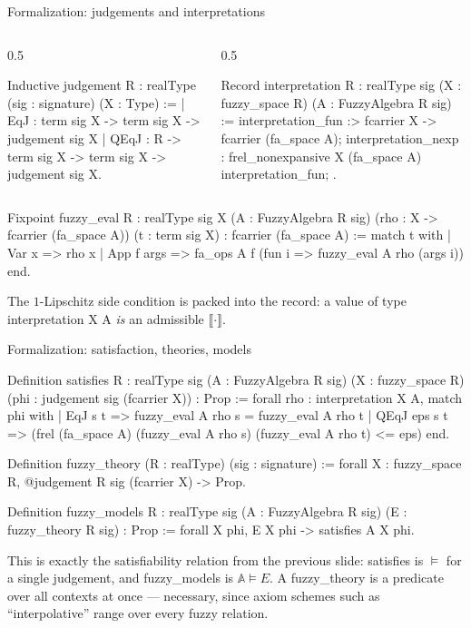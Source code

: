 \documentclass[10pt,aspectratio=169]{beamer}
\newcommand{\den}[1]{\llbracket #1 \rrbracket}
\newcommand{\rid}[1]{{\ttfamily\small #1}}
\begin{document}
\begin{frame}[fragile]{Formalization: judgements and interpretations}
  \begin{columns}[T]
  \begin{column}{0.5\textwidth}
  \begin{srcbox}
Inductive judgement {R : realType}
    (sig : signature) (X : Type) :=
  | EqJ  : term sig X -> term sig X ->
           judgement sig X
  | QEqJ : R -> term sig X -> term sig X ->
           judgement sig X.
  \end{srcbox}
  \end{column}
  \begin{column}{0.5\textwidth}
  \begin{srcbox}
Record interpretation
    {R : realType} {sig}
    (X : fuzzy_space R)
    (A : FuzzyAlgebra R sig) := {
  interpretation_fun :>
    fcarrier X -> fcarrier (fa_space A);
  interpretation_nexp :
    frel_nonexpansive X (fa_space A)
      interpretation_fun;
}.
  \end{srcbox}
  \end{column}
  \end{columns}
  \vfill
  \begin{srcbox}
Fixpoint fuzzy_eval {R : realType} {sig X} (A : FuzzyAlgebra R sig)
    (rho : X -> fcarrier (fa_space A)) (t : term sig X) : fcarrier (fa_space A) :=
  match t with
  | Var x => rho x
  | App f args => fa_ops A f (fun i => fuzzy_eval A rho (args i))
  end.
  \end{srcbox}
  The $1$-Lipschitz side condition is packed into the record: a
  value of type \rid{interpretation X A} \emph{is} an admissible
  $\den{\cdot}$.
\end{frame}

\begin{frame}[fragile]{Formalization: satisfaction, theories, models}
  \begin{srcbox}
Definition satisfies {R : realType} {sig} (A : FuzzyAlgebra R sig)
    (X : fuzzy_space R) (phi : judgement sig (fcarrier X)) : Prop :=
  forall rho : interpretation X A,
    match phi with
    | EqJ s t => fuzzy_eval A rho s = fuzzy_eval A rho t
    | QEqJ eps s t =>
      (frel (fa_space A) (fuzzy_eval A rho s) (fuzzy_eval A rho t) <= eps)%
    end.

Definition fuzzy_theory (R : realType) (sig : signature) :=
  forall X : fuzzy_space R, @judgement R sig (fcarrier X) -> Prop.

Definition fuzzy_models {R : realType} {sig} (A : FuzzyAlgebra R sig)
    (E : fuzzy_theory R sig) : Prop :=
  forall X phi, E X phi -> satisfies A X phi.
  \end{srcbox}
  \vfill
  This is exactly the satisfiability relation from the previous slide:
  \rid{satisfies} is $\models$ for a single judgement, and
  \rid{fuzzy\_models} is $\mathbb{A} \models E$.
  \vfill
  A \rid{fuzzy\_theory} is a predicate over all contexts at
  once --- necessary, since axiom schemes such as
  ``interpolative'' range over every fuzzy relation.
\end{frame}
\end{document}
